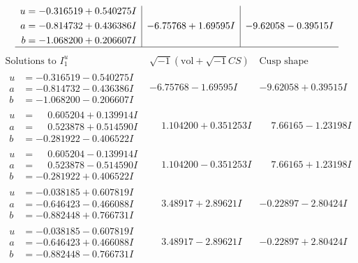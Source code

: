 \documentclass[1p]{elsarticle_modified}
\theoremstyle{definition}
\newcommand{\I}{\sqrt{-1}}
\begin{document}
$$\begin{array}{c|c|c}
\begin{aligned}
u &= -0.316519 + 0.540275 I \\
a &= -0.814732 + 0.436386 I \\
b &= -1.068200 + 0.206607 I\end{aligned}
 & -6.75768 + 1.69595 I & -9.62058 - 0.39515 I\\
 \hline 
 \end{array}$$\newpage$$\begin{array}{c|c|c}  
\text{Solutions to }I^u_{1}& \I (\text{vol} + \sqrt{-1}CS) & \text{Cusp shape}\\
 \hline 
\begin{aligned}
u &= -0.316519 - 0.540275 I \\
a &= -0.814732 - 0.436386 I \\
b &= -1.068200 - 0.206607 I\end{aligned}
 & -6.75768 - 1.69595 I & -9.62058 + 0.39515 I \\ \hline\begin{aligned}
u &= \phantom{-}0.605204 + 0.139914 I \\
a &= \phantom{-}0.523878 + 0.514590 I \\
b &= -0.281922 - 0.406522 I\end{aligned}
 & \phantom{-}1.104200 + 0.351253 I & \phantom{-}7.66165 - 1.23198 I \\ \hline\begin{aligned}
u &= \phantom{-}0.605204 - 0.139914 I \\
a &= \phantom{-}0.523878 - 0.514590 I \\
b &= -0.281922 + 0.406522 I\end{aligned}
 & \phantom{-}1.104200 - 0.351253 I & \phantom{-}7.66165 + 1.23198 I \\ \hline\begin{aligned}
u &= -0.038185 + 0.607819 I \\
a &= -0.646423 - 0.466088 I \\
b &= -0.882448 + 0.766731 I\end{aligned}
 & \phantom{-}3.48917 + 2.89621 I & -0.22897 - 2.80424 I \\ \hline\begin{aligned}
u &= -0.038185 - 0.607819 I \\
a &= -0.646423 + 0.466088 I \\
b &= -0.882448 - 0.766731 I\end{aligned}
 & \phantom{-}3.48917 - 2.89621 I & -0.22897 + 2.80424 I \\ \hline\begin{aligned}

\end{aligned}
\end{array}$$
\end{document}
